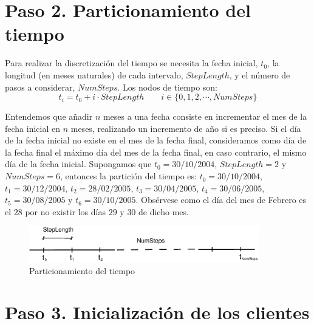 
\section{Paso 2. Particionamiento del tiempo}

Para realizar la discretizaci\'on del tiempo se necesita la fecha inicial, $t_0$,
la longitud (en meses naturales) de cada intervalo, $StepLength$, y el n\'umero
de pasos a considerar, $NumSteps$. Los nodos de tiempo son:
\begin{displaymath}
t_i = t_0 + i \cdot StepLength \qquad i \in \{0, 1, 2, \cdots, NumSteps\}
\end{displaymath}

Entendemos que a\~nadir $n$ meses a una fecha consiste en incrementar el
mes de la fecha inicial en $n$ meses, realizando un incremento de a\~no si
es preciso. Si el d\'ia de la fecha inicial no existe en el mes de la fecha
final, consideramos como d\'ia de la fecha final el m\'aximo d\'ia del mes
de la fecha final, en caso contrario, el mismo d\'ia de la fecha inicial.
\newline
\newline
Supongamos que $t_0=30/10/2004$, $StepLength=2$ y $NumSteps=6$, entonces la
partici\'on del tiempo es: $t_0=30/10/2004$, $t_1=30/12/2004$, $t_2=28/02/2005$,
$t_3=30/04/2005$, $t_4=30/06/2005$, $t_5=30/08/2005$ y $t_6=30/10/2005$.
Obs\'ervese como el d\'ia del mes de Febrero es el $28$ por no existir los
d\'ias $29$ y $30$ de dicho mes.

\begin{figure}[!hb]
\begin{center}
\includegraphics[width=10cm,angle=0]{./images/time.eps}
\caption{Particionamiento del tiempo}
\label{timetranches}
\end{center}
\end{figure}


\section{Paso 3. Inicializaci\'on de los clientes}

